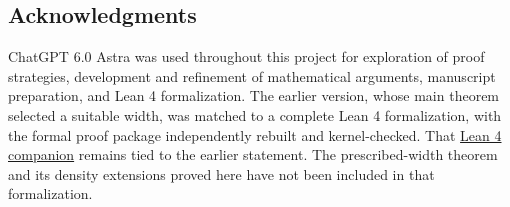 \documentclass[11pt]{article}
\theoremstyle{definition}
\theoremstyle{remark}
\theoremstyle{plain}
\begin{document}
\begin{small}
\section*{Acknowledgments}
ChatGPT 6.0 Astra was used throughout this project for exploration of
proof strategies, development and refinement of mathematical arguments,
manuscript preparation, and Lean 4 formalization.
The earlier version, whose main theorem selected a suitable width,
was matched to a complete Lean 4 formalization, with the formal proof
package independently rebuilt and kernel-checked. That
\href{https://github.com/yuningyang19/rerandSRHT_prob_5_6_simons_workshop/tree/5fb87c321a65baeaac09c79458a7356944647116}{Lean 4 companion}
remains tied to the earlier statement. The prescribed-width theorem
and its density extensions proved here have not been included in
that formalization.

\end{small}
\end{document}
